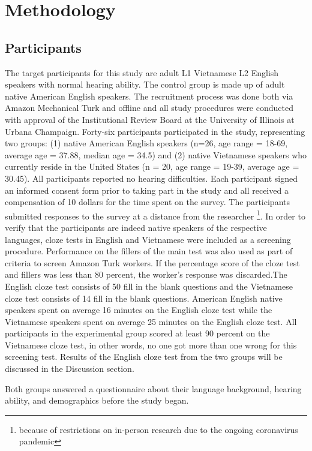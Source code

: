 \documentclass[a4paper]{article}
\begin{document}
\section{Methodology}

\subsection{Participants}

The target participants for this study are adult L1 Vietnamese L2 English speakers with normal hearing ability. The control group is made up of adult native American English speakers. The recruitment process was done both via Amazon Mechanical Turk and offline and all study procedures were conducted with approval of the Institutional Review Board at the University of Illinois at Urbana Champaign. Forty-six participants participated in the study, representing two groups: (1) native American English speakers (n=26, age range = 18-69, average age =  37.88, median age = 34.5) and (2) native Vietnamese speakers who currently reside in the United States (n = 20, age range = 19-39, average age = 30.45). All participants reported no hearing difficulties. Each participant signed an informed consent form prior to taking part in the study and all received a compensation of 10 dollars for the time spent on the survey. The participants submitted responses to the survey at a distance from the researcher \footnote{because of restrictions on in-person research due to the ongoing coronavirus pandemic}. In order to verify that the participants are indeed native speakers of the respective languages, cloze tests in English and Vietnamese were included as a screening procedure. Performance on the fillers of the main test was also used as part of criteria to screen Amazon Turk workers. If the percentage score of the cloze test and fillers was less than 80 percent, the worker's response was discarded.The English cloze test consists of 50 fill in the blank questions and the Vietnamese cloze test consists of 14 fill in the blank questions. American English native speakers spent on average 16 minutes on the English cloze test while the Vietnamese speakers spent on average 25 minutes on the English cloze test. All participants in the experimental group scored at least 90 percent on the Vietnamese cloze test, in other words, no one got more than one wrong for this screening test. Results of the English cloze test from the two groups will be discussed in the Discussion section.
 
Both groups answered a questionnaire about their language background, hearing ability, and demographics before the study began. 
\end{document}
